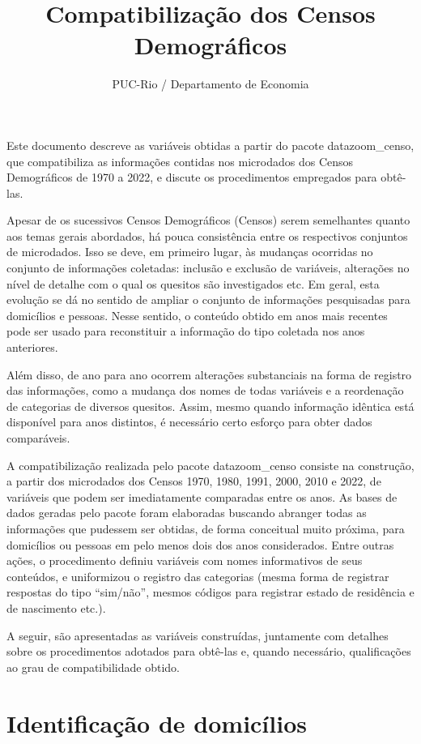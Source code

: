 \documentclass[12pt,a4paper]{article}
\title{Compatibilização dos Censos Demográficos}
\author{PUC-Rio / Departamento de Economia}
\date{}
\begin{document}
\maketitle

Este documento descreve as variáveis obtidas a partir do pacote datazoom\_censo, que compatibiliza as informações contidas nos microdados dos Censos Demográficos de 1970 a 2022, e discute os procedimentos empregados para obtê-las.

Apesar de os sucessivos Censos Demográficos (Censos) serem semelhantes quanto aos temas gerais abordados, há pouca consistência entre os respectivos conjuntos de microdados. Isso se deve, em primeiro lugar, às mudanças ocorridas no conjunto de informações coletadas: inclusão e exclusão de variáveis, alterações no nível de detalhe com o qual os quesitos são investigados etc. Em geral, esta evolução se dá no sentido de ampliar o conjunto de informações pesquisadas para domicílios e pessoas. Nesse sentido, o conteúdo obtido em anos mais recentes pode ser usado para reconstituir a informação do tipo coletada nos anos anteriores.

Além disso, de ano para ano ocorrem alterações substanciais na forma de registro das informações, como a mudança dos nomes de todas variáveis e a reordenação de categorias de diversos quesitos. Assim, mesmo quando informação idêntica está disponível para anos distintos, é necessário certo esforço para obter dados comparáveis.

A compatibilização realizada pelo pacote datazoom\_censo consiste na construção, a partir dos microdados dos Censos 1970, 1980, 1991, 2000, 2010 e 2022, de variáveis que podem ser imediatamente comparadas entre os anos. As bases de dados geradas pelo pacote foram elaboradas buscando abranger todas as informações que pudessem ser obtidas, de forma conceitual muito próxima, para domicílios ou pessoas em pelo menos dois dos anos considerados. Entre outras ações, o procedimento definiu variáveis com nomes informativos de seus conteúdos, e uniformizou o registro das categorias (mesma forma de registrar respostas do tipo ``sim/não'', mesmos códigos para registrar estado de residência e de nascimento etc.).

A seguir, são apresentadas as variáveis construídas, juntamente com detalhes sobre os procedimentos adotados para obtê-las e, quando necessário, qualificações ao grau de compatibilidade obtido.

\section{Identificação de domicílios}
\end{document}
